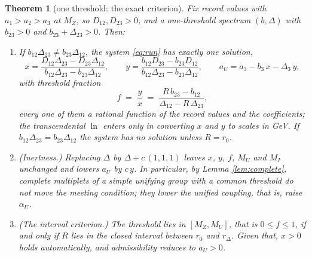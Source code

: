 \documentclass[11pt]{article}
\newtheorem{theorem}{Theorem}[section]
\theoremstyle{definition}
\newcommand{\Dl}{\Delta}
\begin{document}
\begin{theorem}[one threshold: the exact criterion]\label{thm:criterion}
Fix record values with $a_{1} > a_{2} > a_{3}$ at $M_{Z}$, so $D_{12}, D_{23} > 0$, and a one-threshold spectrum $(b, \Dl)$ with $b_{23} > 0$ and $b_{23} + \Dl_{23} > 0$. Then:
\begin{enumerate}
\item[(i)] If $b_{12}\Dl_{23} \ne b_{23}\Dl_{12}$, the system \eqref{eq:run} has exactly one solution,
\[
x = \frac{D_{12}\Dl_{23} - D_{23}\Dl_{12}}{b_{12}\Dl_{23} - b_{23}\Dl_{12}}, \qquad
y = \frac{b_{12}D_{23} - b_{23}D_{12}}{b_{12}\Dl_{23} - b_{23}\Dl_{12}}, \qquad
a_{U} = a_{3} - b_{3}\,x - \Dl_{3}\,y,
\]
with threshold fraction
\[
f \;=\; \frac{y}{x} \;=\; \frac{R\,b_{23} - b_{12}}{\Dl_{12} - R\,\Dl_{23}},
\]
every one of them a rational function of the record values and the coefficients; the transcendental $\ln$ enters only in converting $x$ and $y$ to scales in GeV. If $b_{12}\Dl_{23} = b_{23}\Dl_{12}$ the system has no solution unless $R = r_{0}$.
\item[(ii)] (Inertness.) Replacing $\Dl$ by $\Dl + c\,(1,1,1)$ leaves $x$, $y$, $f$, $M_{U}$ and $M_{I}$ unchanged and lowers $a_{U}$ by $c\,y$. In particular, by Lemma \ref{lem:complete}, complete multiplets of a simple unifying group with a common threshold do not move the meeting condition; they lower the unified coupling, that is, raise $\alpha_{U}$.
\item[(iii)] (The interval criterion.) The threshold lies in $[M_{Z}, M_{U}]$, that is $0 \le f \le 1$, if and only if $R$ lies in the closed interval between $r_{0}$ and $r_{\Dl}$. Given that, $x > 0$ holds automatically, and admissibility reduces to $a_{U} > 0$.
\end{enumerate}
\end{theorem}
\end{document}
